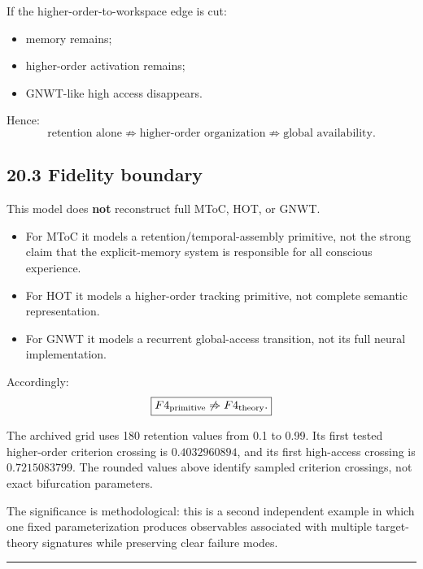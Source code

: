 \documentclass[
  11pt,
  a4paper,
]{article}
\providecommand{\tightlist}{%
  \setlength{\itemsep}{0pt}\setlength{\parskip}{0pt}}
\begin{document}
If the higher-order-to-workspace edge is cut:

\begin{itemize}
\tightlist
\item
  memory remains;
\item
  higher-order activation remains;
\item
  GNWT-like high access disappears.
\end{itemize}

Hence:
\nopagebreak[4]
\[
\boxed{
\text{retention alone}
\not\Rightarrow
\text{higher-order organization}
\not\Rightarrow
\text{global availability}.
}
\]

\hypertarget{fidelity-boundary}{%
\subsection{20.3 Fidelity boundary}\label{fidelity-boundary}}

This model does \textbf{not} reconstruct full MToC, HOT, or GNWT.

\begin{itemize}
\tightlist
\item
  For MToC it models a retention/temporal-assembly primitive, not the
  strong claim that the explicit-memory system is responsible for all
  conscious experience.
\item
  For HOT it models a higher-order tracking primitive, not complete
  semantic representation.
\item
  For GNWT it models a recurrent global-access transition, not its full
  neural implementation.
\end{itemize}

Accordingly:
\nopagebreak[4]
\[
\boxed{
F4_{\rm primitive}
\not\Rightarrow
F4_{\rm theory}.
}
\]

The archived grid uses 180 retention values from 0.1 to 0.99. Its first
tested higher-order criterion crossing is \(0.4032960894\), and its
first high-access crossing is \(0.7215083799\). The rounded values above
identify sampled criterion crossings, not exact bifurcation parameters.

The significance is methodological: this is a second independent example
in which one fixed parameterization produces observables associated with
multiple target-theory signatures while preserving clear failure modes.

\begin{center}\rule{0.5\linewidth}{0.5pt}\end{center}
\end{document}
